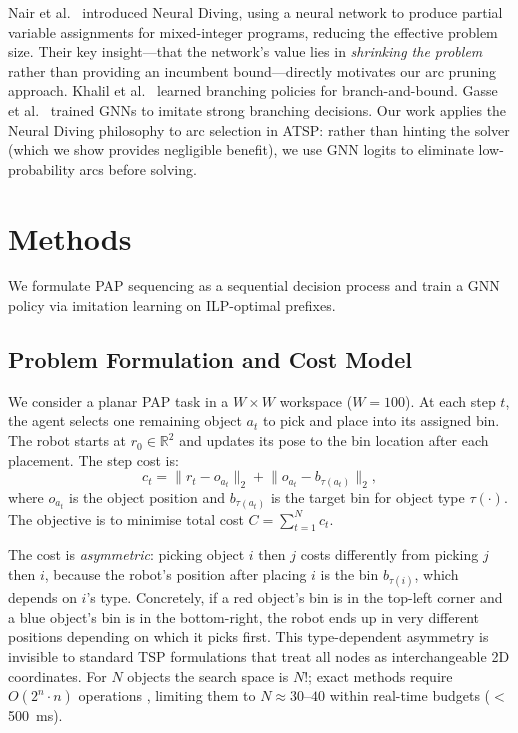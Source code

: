 \documentclass[conference]{IEEEtran}
\begin{document}
Nair et al.\ \cite{nair2021neural} introduced Neural Diving, using a neural network to produce partial variable assignments for mixed-integer programs, reducing the effective problem size. Their key insight---that the network's value lies in \emph{shrinking the problem} rather than providing an incumbent bound---directly motivates our arc pruning approach. Khalil et al.\ \cite{khalil2016learning} learned branching policies for branch-and-bound. Gasse et al.\ \cite{gasse2019exact} trained GNNs to imitate strong branching decisions. Our work applies the Neural Diving philosophy to arc selection in ATSP: rather than hinting the solver (which we show provides negligible benefit), we use GNN logits to eliminate low-probability arcs before solving.

\section{Methods}\label{sec:methods}

We formulate PAP sequencing as a sequential decision process and train a GNN policy via imitation learning on ILP-optimal prefixes.

\subsection{Problem Formulation and Cost Model}

We consider a planar PAP task in a $W \times W$ workspace ($W=100$). At each step $t$, the agent selects one remaining object $a_t$ to pick and place into its assigned bin. The robot starts at $r_0 \in \mathbb{R}^2$ and updates its pose to the bin location after each placement. The step cost is:
\begin{equation}
c_t = \lVert r_t - o_{a_t} \rVert_2 + \lVert o_{a_t} - b_{\tau(a_t)} \rVert_2,
\end{equation}
where $o_{a_t}$ is the object position and $b_{\tau(a_t)}$ is the target bin for object type $\tau(\cdot)$. The objective is to minimise total cost $C = \sum_{t=1}^{N} c_t$.

The cost is \emph{asymmetric}: picking object $i$ then $j$ costs differently from picking $j$ then $i$, because the robot's position after placing $i$ is the bin $b_{\tau(i)}$, which depends on $i$'s type. Concretely, if a red object's bin is in the top-left corner and a blue object's bin is in the bottom-right, the robot ends up in very different positions depending on which it picks first. This type-dependent asymmetry is invisible to standard TSP formulations that treat all nodes as interchangeable 2D coordinates. For $N$ objects the search space is $N!$; exact methods require $O(2^n \cdot n)$ operations \cite{held1962dp}, limiting them to $N \approx 30$--$40$ within real-time budgets ($<$500~ms).
\end{document}
